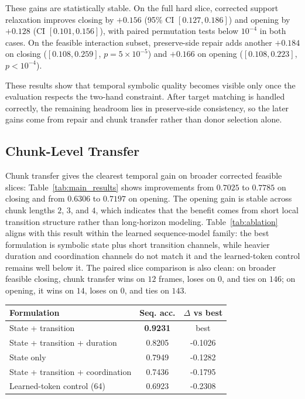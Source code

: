 \documentclass[letterpaper]{article}
\begin{document}
These gains are statistically stable. On the full hard slice, corrected support
relaxation improves closing by $+0.156$ (95\% CI $[0.127, 0.186]$) and opening
by $+0.128$ (CI $[0.101, 0.156]$), with paired permutation tests below
$10^{-4}$ in both cases. On the feasible interaction subset, preserve-side
repair adds another $+0.184$ on closing ($[0.108, 0.259]$, $p = 5\times10^{-5}$)
and $+0.166$ on opening ($[0.108, 0.223]$, $p < 10^{-4}$).

These results show that temporal symbolic quality becomes visible only once the
evaluation respects the two-hand constraint. After target matching is handled
correctly, the remaining headroom lies in preserve-side consistency, so the
later gains come from repair and chunk transfer rather than donor selection
alone.

\subsection{Chunk-Level Transfer}

Chunk transfer gives the clearest temporal gain on broader corrected feasible
slices: Table~\ref{tab:main_results} shows improvements from $0.7025$ to
$0.7785$ on closing and from $0.6306$ to $0.7197$ on opening. The opening gain
is stable across chunk lengths $2$, $3$, and $4$, which indicates that the
benefit comes from short local transition structure rather than long-horizon
modeling. Table~\ref{tab:ablation} aligns with this result within the learned
sequence-model family: the best formulation is symbolic state plus short
transition channels, while heavier duration and coordination channels do not
match it and the learned-token control remains well below it. The paired slice
comparison is also clean: on
broader feasible closing, chunk transfer wins on $12$ frames, loses on $0$, and
ties on $146$; on opening, it wins on $14$, loses on $0$, and ties on $143$.

\begin{center}
\captionsetup{type=table}
\label{tab:ablation}
\small
\begin{tabular}{@{}p{}cc@{}}
    \toprule
    Formulation & Seq. acc. & $\Delta$ vs best \\
    \midrule
    State + transition & \textbf{0.9231} & best \\
    State + transition + duration & 0.8205 & -0.1026 \\
    State only & 0.7949 & -0.1282 \\
    State + transition + coordination & 0.7436 & -0.1795 \\
    Learned-token control (64) & 0.6923 & -0.2308 \\
    \bottomrule
\end{tabular}
\end{center}
\end{document}

